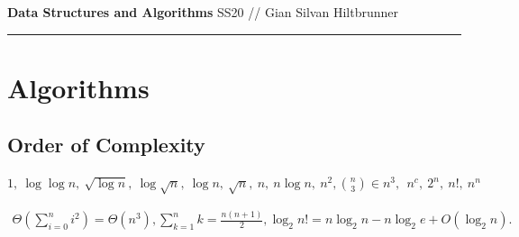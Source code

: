 \documentclass[9pt,landscape,a4paper, table]{extarticle}
\begin{document}
\begin{multicols*}{3}
\raggedright

\large{\textbf{Data Structures and Algorithms} SS20} // \normalsize{Gian Silvan Hiltbrunner}

\hrule

\setlength{\parindent}{0pt}
\setlength{\parskip}{1pt}
\setlength{\abovedisplayskip}{0pt}
\setlength{\belowdisplayskip}{0pt}
\setlength{\abovedisplayshortskip}{0pt}
\setlength{\belowdisplayshortskip}{0pt}


\section{Algorithms}

\subsection{Order of Complexity}
\begin{center}
{\footnotesize
$1,\ \log\log n,\ \sqrt{\log n},\ \log\sqrt{n},\ \log n,\ \sqrt{n},\ n,\ n\log n,\ n^2,\binom{n}{3} \in n^3,\ \ n^c,\  2^n,\ n!,\ n^n$
}
\end{center}
{\footnotesize
\begin{align*}
    \Theta(\sum_{i=0}^n i^2) = \Theta(n^3), 
    \sum_{k=1}^n k = \frac{n(n+1)}{2}, {\displaystyle \log _{2}n!=n\log _{2}n-n\log _{2}e+O(\log _{2}n).}
\end{align*}}

\end{multicols*}
\end{document}
